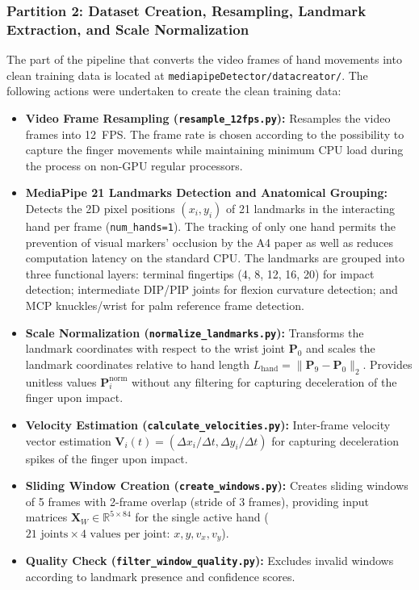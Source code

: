 \subsubsection{Partition 2: Dataset Creation, Resampling, Landmark Extraction, and Scale Normalization}
The part of the pipeline that converts the video frames of hand movements into clean training data is located at \texttt{mediapipeDetector/datacreator/}. The following actions were undertaken to create the clean training data:
\begin{itemize}
    \item \textbf{Video Frame Resampling (\texttt{resample\_12fps.py}):} Resamples the video frames into 12~FPS. The frame rate is chosen according to the possibility to capture the finger movements while maintaining minimum CPU load during the process on non-GPU regular processors.
    \item \textbf{MediaPipe 21 Landmarks Detection and Anatomical Grouping:} Detects the 2D pixel positions $(x_i, y_i)$ of 21 landmarks in the interacting hand per frame (\texttt{num\_hands=1}). The tracking of only one hand permits the prevention of visual markers' occlusion by the A4 paper as well as reduces computation latency on the standard CPU. The landmarks are grouped into three functional layers: terminal fingertips (4, 8, 12, 16, 20) for impact detection; intermediate DIP/PIP joints for flexion curvature detection; and MCP knuckles/wrist for palm reference frame detection.
    \item \textbf{Scale Normalization (\texttt{normalize\_landmarks.py}):} Transforms the landmark coordinates with respect to the wrist joint $\mathbf{P}_0$ and scales the landmark coordinates relative to hand length $L_{\text{hand}} = \|\mathbf{P}_9 - \mathbf{P}_0\|_2$. Provides unitless values $\mathbf{P}_i^{\text{norm}}$ without any filtering for capturing deceleration of the finger upon impact.
    \item \textbf{Velocity Estimation (\texttt{calculate\_velocities.py}):} Inter-frame velocity vector estimation $\mathbf{V}_i(t) = (\Delta x_i / \Delta t, \Delta y_i / \Delta t)$ for capturing deceleration spikes of the finger upon impact.
    \item \textbf{Sliding Window Creation (\texttt{create\_windows.py}):} Creates sliding windows of 5 frames with 2-frame overlap (stride of 3 frames), providing input matrices $\mathbf{X}_W \in \mathbb{R}^{5 \times 84}$ for the single active hand ($21 \text{ joints} \times 4 \text{ values per joint: } x, y, v_x, v_y$).
    \item \textbf{Quality Check (\texttt{filter\_window\_quality.py}):} Excludes invalid windows according to landmark presence and confidence scores.
\end{itemize}


